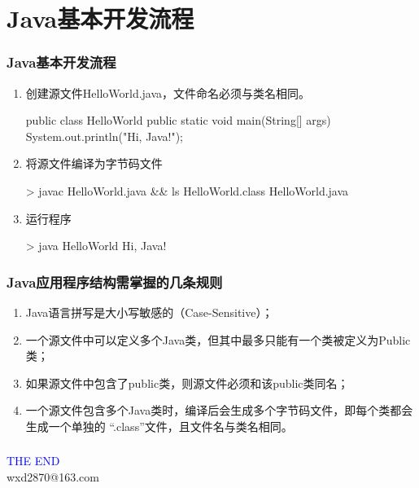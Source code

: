 \documentclass[hyperref={pdfpagelabels=false},compress,table]{beamer} %
\begin{document}
\section{Java基本开发流程}
\begin{frame}[fragile] %
\frametitle{Java基本开发流程}
\begin{enumerate}[<+-| structure@+>]
\item 创建源文件HelloWorld.java，文件命名必须与类名相同。
\begin{javaCode}
public class HelloWorld {
    public static void main(String[] args) {
	System.out.println("Hi, Java!");
    }
}   
\end{javaCode}
\item 将源文件编译为字节码文件
\begin{shCode}
> javac HelloWorld.java && ls 
HelloWorld.class  HelloWorld.java
\end{shCode}
\item 运行程序
\begin{shCode}
> java HelloWorld 
Hi, Java!
\end{shCode}
\end{enumerate}
\end{frame}

\begin{frame}[fragile] %
\frametitle{Java应用程序结构需掌握的几条规则}

\begin{enumerate}[<+-| alert@+>]
\item Java语言拼写是大小写敏感的（Case-Sensitive）；
\item 一个源文件中可以定义多个Java类，但其中最多只能有一个类被定义为Public类；
\item 如果源文件中包含了public类，则源文件必须和该public类同名；
\item 一个源文件包含多个Java类时，编译后会生成多个字节码文件，即每个类都会生成一个单独的
  “.class”文件，且文件名与类名相同。
\end{enumerate}
\end{frame}
\begin{frame}[fragile] %
\frametitle{}

\end{frame}

\begin{frame}
\centering
{\Huge \textcolor{blue}{THE END}} \\
\vspace{5mm}
{\Large wxd2870@163.com} \\
\end{frame}
\end{document}
